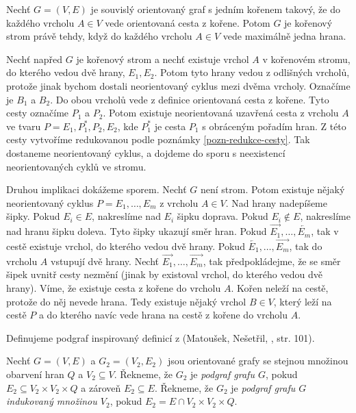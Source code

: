 \begin{lemma}\label{lemma-char-korenoveho-stromu}
    Nechť $G=(V,E)$ je souvislý orientovaný graf s jedním kořenem takový, že do každého vrcholu $A \in V$ vede orientovaná cesta z kořene. Potom $G$ je kořenový strom právě tehdy, když do každého vrcholu $A \in V$ vede maximálně jedna hrana. 
\end{lemma}
\begin{dukaz}
    Nechť napřed $G$ je kořenový strom a nechť existuje vrchol $A$ v kořenovém stromu, do kterého vedou dvě hrany, $E_1, E_2$. Potom tyto hrany vedou z odlišných vrcholů, protože jinak bychom dostali neorientovaný cyklus mezi dvěma vrcholy. Označíme je $B_1$ a $B_2$. Do obou vrcholů vede z definice orientovaná cesta z kořene. Tyto cesty označíme $P_1$ a $P_2$. Potom existuje neorientovaná uzavřená cesta z vrcholu $A$ ve tvaru $P = E_1, P_1^*, P_2, E_2$, kde $P_1^*$ je cesta $P_1$ s obráceným pořadím hran. Z této cesty vytvoříme redukovanou podle poznámky \ref{pozn-redukce-cesty}. 
    Tak dostaneme neorientovaný cyklus, a dojdeme do sporu s neexistencí neorientovaných cyklů ve stromu.

    Druhou implikaci dokážeme sporem. Nechť $G$ není strom. Potom existuje nějaký neorientovaný cyklus $P = E_1, \dots , E_m$ z vrcholu $A \in V$. Nad hrany nadepíšeme šipky. Pokud $E_i \in E$, nakreslíme nad $E_i$ šipku doprava. Pokud $E_i \notin E$, nakreslíme nad hranu šipku doleva. Tyto šipky ukazují směr hran. Pokud $\overrightarrow{E_1}, \dots , \overleftarrow{E_m}$, tak v cestě existuje vrchol, do kterého vedou dvě hrany. Pokud $\overleftarrow{E_1}, \dots , \overrightarrow{E_m}$, tak do vrcholu $A$ vstupují dvě hrany. Nechť $\overrightarrow{E_1}, \dots , \overrightarrow{E_m}$, tak předpokládejme, že se směr šipek uvnitř cesty nezmění (jinak by existoval vrchol, do kterého vedou dvě hrany). Víme, že existuje cesta z kořene do vrcholu $A$. Kořen neleží na cestě, protože do něj nevede hrana. Tedy existuje nějaký vrchol $B \in V$, který leží na cestě $P$ a do kterého navíc vede hrana na cestě z kořene do vrcholu $A$. 
\end{dukaz}

Definujeme podgraf inspirovaný definicí z (Matoušek, Nešetřil, \cite{matouvsek2009kapitoly}, str. 101).
\begin{definice}[Podgraf]
    Nechť $G = (V,E)$ a $G_2 = (V_2, E_2)$ jsou orientované grafy se stejnou množinou obarvení hran $Q$ a $V_2 \subseteq V$. Řekneme, že $G_2$ je \emph{podgraf grafu $G$}, pokud $E_2 \subseteq V_2 \times V_2 \times Q$ a zároveň $E_2 \subseteq E$.
    Řekneme, že $G_2$ je \emph{podgraf grafu $G$ indukovaný množinou $V_2$}, pokud $E_2 =  E \cap V_2\times V_2 \times Q$.
\end{definice}

